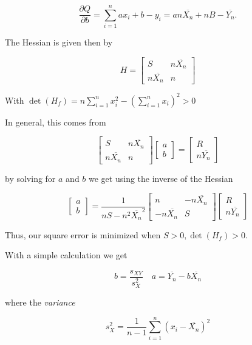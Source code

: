 \[
    \frac{\partial Q}{\partial b}  = \sum_{i = 1}^{n} a x_i + b - y_i = an \overline{X_n} + nB - \overline{Y_n}.
\]

The Hessian is given then by 

\[
    H = 
    \begin{bmatrix}
        S & n \overline{X_n} \\ 
        n \overline{X_n} & n
    \end{bmatrix}
\]

With \(\det(H_f) = n\sum_{i = 1}^{n} x_i^2 - \left(\sum_{i = 1}^{n} x_i\right)^2 > 0\)

In general, this comes from 

\[
    \begin{bmatrix}
        S & n \overline{X_n} \\
        n \overline{X_n} & n
    \end{bmatrix}
    \begin{bmatrix}
        a \\ 
        b
    \end{bmatrix}
    = 
    \begin{bmatrix}
        R \\ 
        n \overline{Y_n}
    \end{bmatrix}
\]

by solving for \(a\) and \(b\) we get using the inverse of the Hessian 

\[
    \begin{bmatrix}
        a \\ 
        b
    \end{bmatrix}
    =
    \frac{1}{nS - n^2 \overline{X_n}^2} 
    \begin{bmatrix}
        n & -n \overline{X_n} \\ 
        -n \overline{X_n} & S
    \end{bmatrix}
    \begin{bmatrix}
        R \\ 
        n \overline{Y_n}
    \end{bmatrix}
\]

Thus, our square error is minimized when \(S > 0, \det(H_f) > 0\).

With a simple calculation we get 

\[
    b = \frac{s_{XY}}{s_{X}^2} \quad a = \overline{Y_n} - b \overline{X_n}
\]

where the \emph{variance}

\[
    s_{X}^2 = \frac{1}{n - 1} \sum_{i = 1}^{n} (x_i - \overline{X_n})^2
\]

